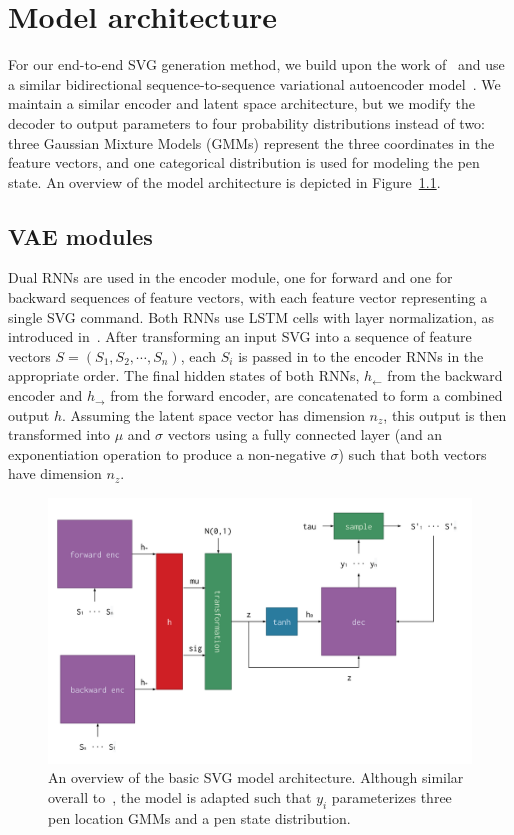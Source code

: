 \chapter{Model architecture}
For our end-to-end SVG generation method, we build upon the work of~\citeauthor{ha2017neural} and use a similar bidirectional sequence-to-sequence variational autoencoder model~\cite{ha2017neural}.
We maintain a similar encoder and latent space architecture, but we modify the decoder to output parameters to four probability distributions instead of two: three Gaussian Mixture Models (GMMs) represent the three coordinates in the feature vectors, and one categorical distribution is used for modeling the pen state.
An overview of the model architecture is depicted in Figure~\ref{fig:architecture}.

\section{VAE modules}
Dual RNNs are used in the encoder module, one for forward and one for backward sequences of feature vectors, with each feature vector representing a single SVG command.
Both RNNs use LSTM cells with layer normalization, as introduced in~\cite{ba2016layer}.
After transforming an input SVG into a sequence of feature vectors $S = (S_1, S_2, \cdots, S_n)$, each $S_i$ is passed in to the encoder RNNs in the appropriate order.
The final hidden states of both RNNs, $h_\leftarrow$ from the backward encoder and $h_\to$ from the forward encoder, are concatenated to form a combined output $h$.
Assuming the latent space vector has dimension $n_z$, this output is then transformed into $\mu$ and $\sigma$ vectors using a fully connected layer (and an exponentiation operation to produce a non-negative $\sigma$) such that both vectors have dimension $n_z$.

\begin{figure}[h]
\centering
\caption[An overview of the basic SVG model architecture]{An overview of the basic SVG model architecture.
Although similar overall to~\cite{ha2017neural}, the model is adapted such that $y_i$ parameterizes three pen location GMMs and a pen state distribution.\label{fig:architecture}}
\includegraphics[width=\textwidth]{figures/architecture}
\end{figure}


